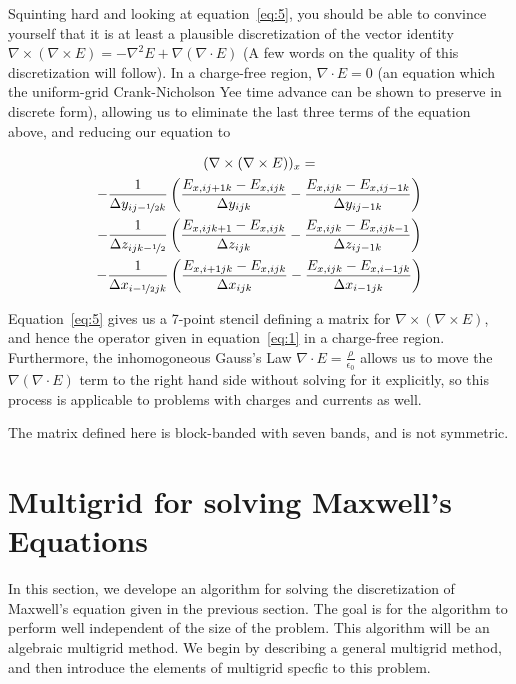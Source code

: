 \documentclass{article}
\newcommand{\Fijk}[5]{{#1}_{{#2},{#3}{#4}{#5}}}
\newcommand{\curl}[1]{\nabla \times {#1}}
\newcommand{\dxijk}[3]{\Delta x _{{#1}{#2}{#3}}}
\newcommand{\dyijk}[3]{\Delta y _{{#1}{#2}{#3}}}
\newcommand{\dzijk}[3]{\Delta z _{{#1}{#2}{#3}}}
\newcommand{\dxdual}{\Delta x_{i-\nicefrac{1}{2}jk}}
\newcommand{\dydual}{\Delta y_{ij-\nicefrac{1}{2}k}}
\newcommand{\dzdual}{\Delta z_{ijk-\nicefrac{1}{2}}}
\newcommand{\delxe}{(\curl{E})}
\begin{document}
Squinting hard and looking at equation~\ref{eq:5}, you should be able
to convince yourself that it is at least a plausible discretization of
the vector identity $\curl{ \delxe} = -\nabla^2 E + \nabla (\nabla
\cdot E)$ (A few words on the quality of this discretization will
follow).  In a charge-free region, $\nabla \cdot E = 0$ (an equation
which the uniform-grid Crank-Nicholson Yee time advance can be shown
to preserve in discrete form), allowing us to eliminate the last three
terms of the equation above, and reducing our equation to 

\begin{multline}
  \label{eq:6}
  (\curl{ \delxe})_x = \\
  - \frac{1}{\dydual}
  \left( \frac{  \Fijk{E}{x}{i}{j+1}{k}  - \Fijk{E}{x}{i}{j}{k}}
    {\dyijk{i}{j}{k}}
    - \frac{  \Fijk{E}{x}{i}{j}{k}  - \Fijk{E}{x}{i}{j-1}{k}}
    {\dyijk{i}{j-1}{k}} \right) \\
  - \frac{1}{\dzdual}
  \left( \frac{  \Fijk{E}{x}{i}{j}{k+1}  - \Fijk{E}{x}{i}{j}{k}}
    {\dzijk{i}{j}{k}}
    - \frac{  \Fijk{E}{x}{i}{j}{k}  - \Fijk{E}{x}{i}{j}{k-1}}
    {\dzijk{i}{j-1}{k}} \right) \\
  - \frac{1}{\dxdual}
  \left( \frac{  \Fijk{E}{x}{i+1}{j}{k}  - \Fijk{E}{x}{i}{j}{k}}
    {\dxijk{i}{j}{k}}
    - \frac{  \Fijk{E}{x}{i}{j}{k}  - \Fijk{E}{x}{i-1}{j}{k}}
    {\dxijk{i-1}{j}{k}} \right)
\end{multline}

Equation~\ref{eq:5} gives us a 7-point stencil defining a matrix for
$\curl{\delxe}$, and hence the operator given in equation~\ref{eq:1}
in a charge-free region.  Furthermore, the
inhomogoneous Gauss's Law $\nabla \cdot E = \frac{\rho}{\epsilon_0}$
allows us to move the $\nabla(\nabla \cdot E)$ term to the right hand
side without solving for it explicitly, so this process is applicable
to problems with charges and currents as well.

The matrix defined here is block-banded with seven bands, and is not
symmetric.

\section{Multigrid for solving Maxwell's Equations}

	In this section, we develope an algorithm for solving the discretization of Maxwell's equation given in the previous section.  The goal is for the algorithm to perform well independent of the size of the problem. This algorithm will be an algebraic multigrid method.  We begin by describing a general multigrid method, and then introduce the elements of multigrid specfic to this problem.
\end{document}
